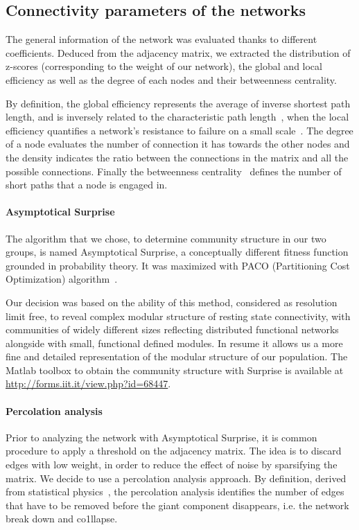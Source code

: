 \subsection{Connectivity parameters of the networks}
The general information of the network was evaluated thanks to different coefficients.
Deduced from the adjacency matrix, we extracted the distribution of z-scores (corresponding to the weight of our network), the global and local efficiency as well as the degree of each nodes and their betweenness centrality. 

By definition, the global efficiency represents the average of inverse shortest path length, and is inversely related to the characteristic path length~\cite{rubinov2010}, when the local efficiency quantifies a network's resistance to failure on a small scale~\cite{bullmore2009}.
The degree of a node evaluates the number of connection it has towards the other nodes and the density indicates the ratio between the connections in the matrix and all the possible connections.
Finally the betweenness centrality~\cite{freeman1978} defines the number of short paths that a node is engaged in.

\paragraph{Asymptotical Surprise}

The algorithm that we chose, to determine community structure in our two groups, is named Asymptotical Surprise, a conceptually different fitness function grounded in probability theory. It was maximized with PACO (Partitioning Cost Optimization) algorithm~\cite{nicolini2016,nicolini2017}.

Our decision was based on the ability of this method, considered as resolution limit free, to reveal complex modular structure of resting state connectivity, with communities of widely different sizes reflecting distributed functional networks alongside with small, functional defined modules. In resume it allows us a more fine and detailed representation of the modular structure of our population.
The Matlab toolbox to obtain the community structure with Surprise is available at \url{http://forms.iit.it/view.php?id=68447}.

\paragraph{Percolation analysis}

Prior to analyzing the network with Asymptotical Surprise, it is common procedure to apply a threshold on the adjacency matrix. 
The idea is to discard edges with low weight, in order to reduce the effect of noise by sparsifying the matrix. 
We decide to use a percolation analysis approach. 
By definition, derived from statistical physics~\cite{stauffer1994,alexander-bloch2010,gallos2012,fornito2016}, the percolation analysis identifies the number of edges that have to be removed before the giant component disappears, i.e. the network break down and co1llapse.


